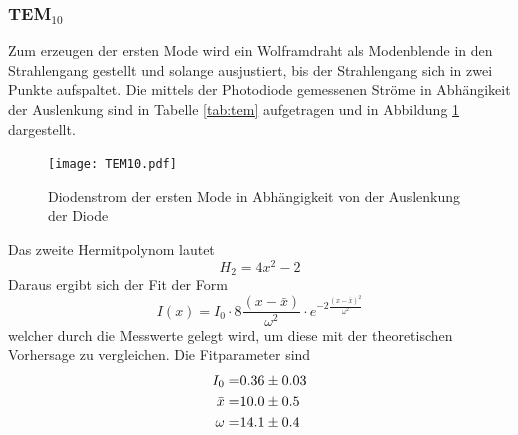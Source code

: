 \subsubsection{TEM$_\text{10}$}
Zum erzeugen der ersten Mode wird ein Wolframdraht als Modenblende in den Strahlengang gestellt und solange ausjustiert, bis der Strahlengang sich in zwei Punkte aufspaltet. Die mittels der Photodiode gemessenen Ströme in Abhängikeit der Auslenkung sind in Tabelle \ref{tab:tem} aufgetragen und in Abbildung \ref{fig:TEM10} dargestellt.
\begin{figure}
  \centering
  \texttt{[image: TEM10.pdf]}
  \caption{Diodenstrom der ersten Mode in Abhängigkeit von der Auslenkung der Diode}
  \label{fig:TEM10}
\end{figure}
Das zweite Hermitpolynom lautet
\begin{equation}
  H_2 = 4x^2 - 2
  \label{eqn:Herm}
\end{equation}
Daraus ergibt sich der Fit der Form
\begin{equation}
  I(x) = I_0 \cdot 8 \frac{\left( x - \bar{x} \right)}{\omega^2} \cdot e^{-2 \frac{\left( x - \bar{x} \right)^2}{\omega^2}}
  \label{eqn:TEM10}
\end{equation}
welcher durch die Messwerte gelegt wird, um diese mit der theoretischen Vorhersage zu vergleichen. Die Fitparameter sind
\begin{eqnarray}
  I_0 =& \num{0.36 +- 0.03}	\\
  \bar{x} =& \num{10.0 +- 0.5} \\
  \omega =& \num{14.1 +- 0.4}
\end{eqnarray}

